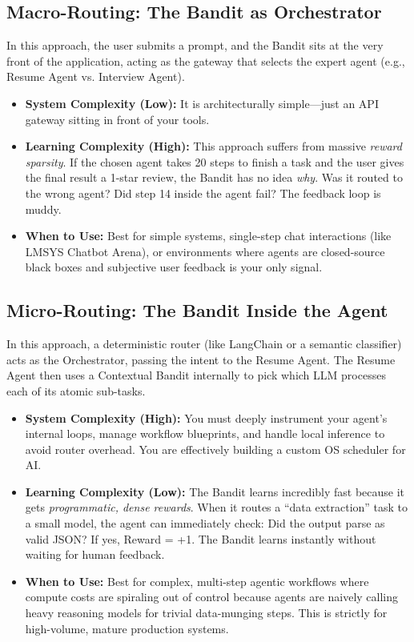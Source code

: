 \documentclass[12pt,a4paper]{article}
\begin{document}
\subsection{Macro-Routing: The Bandit as Orchestrator}
In this approach, the user submits a prompt, and the Bandit sits at the very front of the application, acting as the gateway that selects the expert agent (e.g., Resume Agent vs. Interview Agent).
\begin{itemize}
    \item \textbf{System Complexity (Low):} It is architecturally simple—just an API gateway sitting in front of your tools.
    \item \textbf{Learning Complexity (High):} This approach suffers from massive \textit{reward sparsity}. If the chosen agent takes 20 steps to finish a task and the user gives the final result a 1-star review, the Bandit has no idea \textit{why}. Was it routed to the wrong agent? Did step 14 inside the agent fail? The feedback loop is muddy.
    \item \textbf{When to Use:} Best for simple systems, single-step chat interactions (like LMSYS Chatbot Arena), or environments where agents are closed-source black boxes and subjective user feedback is your only signal.
\end{itemize}

\subsection{Micro-Routing: The Bandit Inside the Agent}
In this approach, a deterministic router (like LangChain or a semantic classifier) acts as the Orchestrator, passing the intent to the Resume Agent. The Resume Agent then uses a Contextual Bandit internally to pick which LLM processes each of its atomic sub-tasks.
\begin{itemize}
    \item \textbf{System Complexity (High):} You must deeply instrument your agent's internal loops, manage workflow blueprints, and handle local inference to avoid router overhead. You are effectively building a custom OS scheduler for AI.
    \item \textbf{Learning Complexity (Low):} The Bandit learns incredibly fast because it gets \textit{programmatic, dense rewards}. When it routes a ``data extraction'' task to a small model, the agent can immediately check: Did the output parse as valid JSON? If yes, Reward = +1. The Bandit learns instantly without waiting for human feedback.
    \item \textbf{When to Use:} Best for complex, multi-step agentic workflows where compute costs are spiraling out of control because agents are naively calling heavy reasoning models for trivial data-munging steps. This is strictly for high-volume, mature production systems.
\end{itemize}
\end{document}
